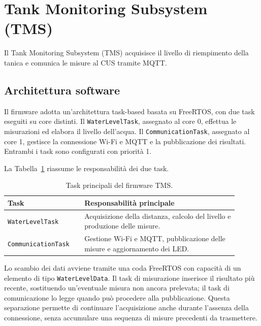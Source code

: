 \section{Tank Monitoring Subsystem (TMS)}
\label{sec:tms}

Il Tank Monitoring Subsystem (TMS) acquisisce il livello di
riempimento della tanica e comunica le misure al CUS tramite MQTT.


\subsection{Architettura software}
\label{subsec:tms-architecture}

Il firmware adotta un'architettura task-based basata su FreeRTOS,
con due task eseguiti su core distinti.
Il \texttt{WaterLevelTask}, assegnato al core 0, effettua
le misurazioni ed elabora il livello dell'acqua.
Il \texttt{CommunicationTask}, assegnato al core 1, gestisce
la connessione Wi-Fi e MQTT e la pubblicazione dei risultati.
Entrambi i task sono configurati con priorità 1.

La Tabella~\ref{tab:tms-tasks} riassume le responsabilità
dei due task.

\begin{table}[htbp]
    \centering
    \begin{tabular}{p{0.30\linewidth} p{0.60\linewidth}}
        \hline
        \textbf{Task} & \textbf{Responsabilità principale} \\
        \hline

        \texttt{WaterLevelTask} &
        Acquisizione della distanza, calcolo del livello
        e produzione delle misure. \\

        \texttt{CommunicationTask} &
        Gestione Wi-Fi e MQTT, pubblicazione delle misure
        e aggiornamento dei LED. \\

        \hline
    \end{tabular}
    \caption{Task principali del firmware TMS.}
    \label{tab:tms-tasks}
\end{table}

Lo scambio dei dati avviene tramite una coda FreeRTOS con capacità
di un elemento di tipo \texttt{WaterLevelData}.
Il task di misurazione inserisce il risultato più recente,
sostituendo un'eventuale misura non ancora prelevata;
il task di comunicazione lo legge quando può procedere
alla pubblicazione.
Questa separazione permette di continuare l'acquisizione anche
durante l'assenza della connessione, senza accumulare una sequenza
di misure precedenti da trasmettere.


